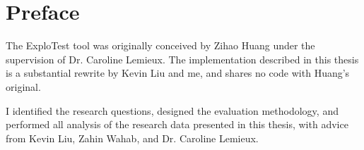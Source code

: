 \chapter{Preface}

The ExploTest tool was originally conceived by Zihao Huang under the supervision of Dr. Caroline Lemieux. The implementation described in this thesis is a substantial rewrite by Kevin Liu and me, and shares no code with Huang's original.

I identified the research questions, designed the evaluation methodology, and performed all analysis of the research data presented in this thesis, with advice from Kevin Liu, Zahin Wahab, and Dr. Caroline Lemieux.
